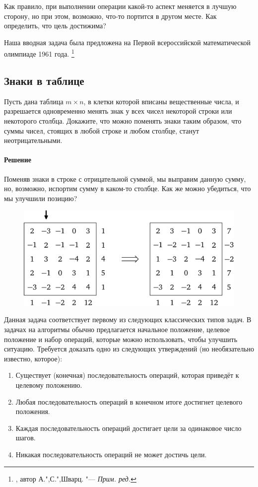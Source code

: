 \documentclass[twoside]{book}
\makeatletter
\newcommand{\rindex}[2][\imki@jobname]{%
  \index[#1]{\detokenize{#2}}%
}
\makeatother
\begin{document}
Как правило, при выполнении операции какой-то аспект меняется в лучшую сторону, но при этом, возможно, что-то портится в другом месте.
Как определить, что цель достижима?

Наша вводная задача была предложена на Первой всероссийской математической олимпиаде 1961 года.%
\footnote{ \cite[№7]{ВсМО}, автор А.",С.",Шварц. "--- \emph{Прим. ред.}}

\subsection*{Знаки в таблице}%
\rindex{Знаки в таблице}

Пусть дана таблица $m\times n$, в клетки которой вписаны вещественные числа, и разрешается одновременно менять знак у всех чисел некоторой строки или некоторого столбца.
Докажите, что можно поменять знаки таким образом, что суммы чисел, стоящих в любой строке и любом столбце, станут неотрицательными.

\paragraph{Решение}
Поменяв знаки в строке с отрицательной суммой, мы выправим данную сумму, но, возможно, испортим сумму в каком-то столбце.
Как же можно убедиться, что мы улучшили позицию?

\begin{figure}
\centering
\includegraphics{mp/wink-16}
\end{figure}


Данная задача соответствует первому из следующих классических типов задач.
В задачах на алгоритмы обычно предлагается начальное положение, целевое положение и набор операций, которые можно использовать, чтобы улучшить ситуацию.
Требуется доказать одно из следующих утверждений (но необязательно известно, которое):
\begin{enumerate}[label=(\arabic*),noitemsep,leftmargin=\parindent,labelsep=3.5pt]
\item Существует (конечная) последовательность операций, которая приведёт к целевому положению.
\item Любая последовательность операций в конечном итоге достигнет целевого положения.
\item Каждая последовательность операций достигает цели за одинаковое число шагов.
\item Никакая последовательность операций не может достичь цели.
\end{enumerate}
\end{document}
